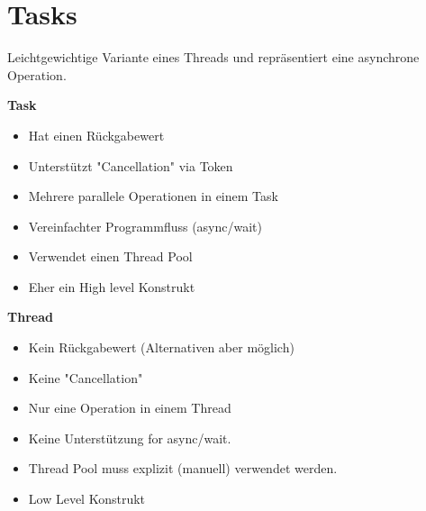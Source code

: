 \section{Tasks}
Leichtgewichtige Variante eines Threads und repräsentiert eine asynchrone Operation. 

\begin{minipage}{0,5\linewidth}
\textbf{Task}  
\begin{itemize}
  \itemsep -0.5em 
  \item Hat einen Rückgabewert
  \item Unterstützt "Cancellation" via Token
  \item Mehrere parallele Operationen in einem Task
  \item Vereinfachter Programmfluss (async/wait)
  \item Verwendet einen Thread Pool
  \item Eher ein High level Konstrukt
\end{itemize}
\end{minipage}
\begin{minipage}{0,5\linewidth}
\textbf{Thread}   
\begin{itemize}
  \itemsep -0.5em 
  \item Kein Rückgabewert (Alternativen aber möglich)
  \item Keine "Cancellation"
  \item Nur eine Operation in einem Thread
  \item Keine Unterstützung for async/wait.
  \item Thread Pool muss explizit (manuell) verwendet werden.
  \item Low Level Konstrukt
\end{itemize}

\end{minipage}



\pagebreak
